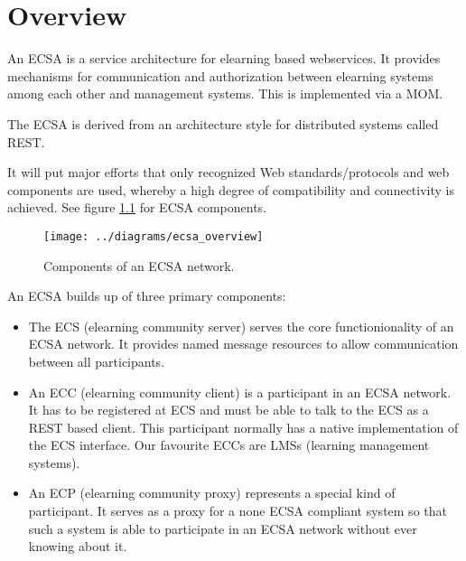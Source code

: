 \chapter{Overview}

An ECSA
is a service architecture for elearning based webservices. It provides
mechanisms for communication and authorization between elearning systems among
each other and management systems. This is implemented via a
MOM.

The ECSA is derived from an architecture style for distributed systems
called REST. 

It will put major efforts that only recognized Web standards/protocols
and web components are used, whereby a high degree of compatibility
and connectivity is achieved. See figure \ref{fig:ecsa_components}
for ECSA components.

\begin{figure}
\noindent \begin{centering}
\texttt{[image: ../diagrams/ecsa\_overview]}
\par\end{centering}
\caption[ECSA components.]{\label{fig:ecsa_components}Components of an ECSA network.}
\end{figure}

An ECSA builds up of three primary components:
\begin{itemize}
  \item The ECS (elearning community server) serves the core functionionality of an ECSA network. It provides
  named message resources to allow communication between all participants. 
  \item An ECC (elearning community client)
  is a participant in an ECSA
  network. It has to be registered at ECS and must be able to talk to the ECS
  as a REST based client. This participant normally has a native implementation
  of the ECS interface. Our favourite ECCs are LMSs (learning management
  systems).
  \item An ECP (elearning community proxy)
  represents a special kind of participant. It serves as a proxy for a none
  ECSA compliant system so that such a system is able to participate in an ECSA
  network without ever knowing about it. 
\end{itemize}

